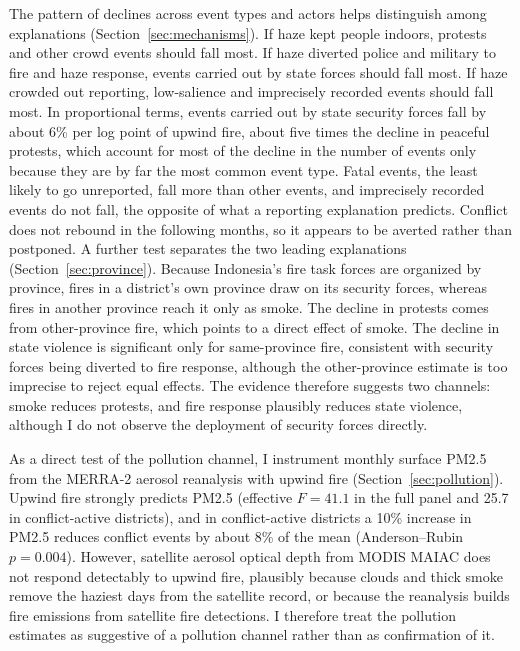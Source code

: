 \documentclass[12pt]{article}
\begin{document}
The pattern of declines across event types and actors helps distinguish among explanations (Section~\ref{sec:mechanisms}). If haze kept people indoors, protests and other crowd events should fall most. If haze diverted police and military to fire and haze response, events carried out by state forces should fall most. If haze crowded out reporting, low-salience and imprecisely recorded events should fall most. In proportional terms, events carried out by state security forces fall by about 6\% per log point of upwind fire, about five times the decline in peaceful protests, which account for most of the decline in the number of events only because they are by far the most common event type. Fatal events, the least likely to go unreported, fall more than other events, and imprecisely recorded events do not fall, the opposite of what a reporting explanation predicts. Conflict does not rebound in the following months, so it appears to be averted rather than postponed. A further test separates the two leading explanations (Section~\ref{sec:province}). Because Indonesia's fire task forces are organized by province, fires in a district's own province draw on its security forces, whereas fires in another province reach it only as smoke. The decline in protests comes from other-province fire, which points to a direct effect of smoke. The decline in state violence is significant only for same-province fire, consistent with security forces being diverted to fire response, although the other-province estimate is too imprecise to reject equal effects. The evidence therefore suggests two channels: smoke reduces protests, and fire response plausibly reduces state violence, although I do not observe the deployment of security forces directly.

As a direct test of the pollution channel, I instrument monthly surface PM2.5 from the MERRA-2 aerosol reanalysis \citep{gelaro2017merra} with upwind fire (Section~\ref{sec:pollution}). Upwind fire strongly predicts PM2.5 (effective $F = 41.1$ in the full panel and 25.7 in conflict-active districts), and in conflict-active districts a 10\% increase in PM2.5 reduces conflict events by about 8\% of the mean (Anderson--Rubin $p=0.004$). However, satellite aerosol optical depth from MODIS MAIAC does not respond detectably to upwind fire, plausibly because clouds and thick smoke remove the haziest days from the satellite record, or because the reanalysis builds fire emissions from satellite fire detections. I therefore treat the pollution estimates as suggestive of a pollution channel rather than as confirmation of it.
\end{document}
